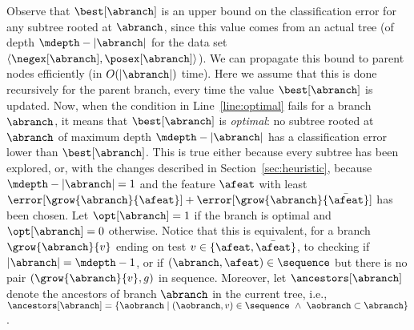 \documentclass{article}
\begin{document}




Observe that $\best[\abranch]$ is an upper bound on the classification error for any subtree rooted at $\abranch$, since this value comes from an actual tree (of depth $\mdepth - |\abranch|$ for the data set $\langle \negex[\abranch],\posex[\abranch] \rangle$). We can propagate this bound to parent nodes efficiently (in $O(|\abranch|)$ time). Here we assume that this is done recursively for the parent branch, every time the value $\best[\abranch]$ is  updated. %
%
Now, when the condition in Line~\ref{line:optimal} fails for a branch $\abranch$, it means that $\best[\abranch]$ is \emph{optimal}: no subtree rooted at $\abranch$ of maximum depth $\mdepth - |\abranch|$ has a classification error lower than $\best[\abranch]$. This is true either because every subtree has been explored, or, with the changes described in Section~\ref{sec:heuristic}, because $\mdepth - |\abranch| = 1$ and the feature $\afeat$ with least 
$\error[\grow{\abranch}{\afeat}] + \error[\grow{\abranch}{\bar{\afeat}}]$
has been chosen. 
Let $\opt[\abranch]=1$ if the branch is optimal and $\opt[\abranch]=0$ otherwise. Notice that this is equivalent, for a branch $\grow{\abranch}{v}$ ending on test $v \in \{\afeat,\bar{\afeat}\}$, to checking if $|\abranch|=\mdepth-1$, or if $(\abranch,\afeat) \in \sequence$ but there is no pair $(\grow{\abranch}{v}, g)$ in sequence.
Moreover, let $\ancestors[\abranch]$ denote the ancestors of branch $\abranch$ in the current tree, i.e., $\ancestors[\abranch] = \{\aobranch \mid (\aobranch,v) \in \sequence ~\wedge~ \aobranch \subset \abranch\}$.
%
%
\end{document}
